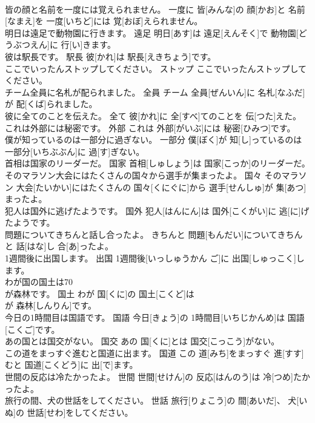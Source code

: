 \documentclass[8pt]{extreport}
\begin{document}
\begin{CJK}{UTF8}{min}
\\	皆の顔と名前を一度には覚えられません。	一度に	皆[みんな]の 顔[かお]と 名前[なまえ]を 一度[いちど]には 覚[おぼ]えられません。	
\\	明日は遠足で動物園に行きます。	遠足	明日[あす]は 遠足[えんそく]で 動物園[どうぶつえん]に 行[い]きます。	
\\	彼は駅長です。	駅長	彼[かれ]は 駅長[えきちょう]です。	
\\	ここでいったんストップしてください。	ストップ	ここでいったんストップしてください。	
\\	チーム全員に名札が配られました。	全員	チーム 全員[ぜんいん]に 名札[なふだ]が 配[くば]られました。	
\\	彼に全てのことを伝えた。	全て	彼[かれ]に 全[すべ]てのことを 伝[つた]えた。	
\\	これは外部には秘密です。	外部	これは 外部[がいぶ]には 秘密[ひみつ]です。	
\\	僕が知っているのは一部分に過ぎない。	一部分	僕[ぼく]が 知[し]っているのは 一部分[いちぶぶん]に 過[す]ぎない。	
\\	首相は国家のリーダーだ。	国家	首相[しゅしょう]は 国家[こっか]のリーダーだ。	
\\	そのマラソン大会にはたくさんの国々から選手が集まったよ。	国々	そのマラソン 大会[たいかい]にはたくさんの 国々[くにぐに]から 選手[せんしゅ]が 集[あつ]まったよ。	
\\	犯人は国外に逃げたようです。	国外	犯人[はんにん]は 国外[こくがい]に 逃[に]げたようです。	
\\	問題についてきちんと話し合ったよ。	きちんと	問題[もんだい]についてきちんと 話[はな]し 合[あ]ったよ。	
\\	1週間後に出国します。	出国	1週間後[いっしゅうかん ご]に 出国[しゅっこく]します。	
\\	わが国の国土は70
\\	が森林です。	国土	わが 国[くに]の 国土[こくど]は 
\\	[ななじゅっぱーせんと]が 森林[しんりん]です。	
\\	今日の1時間目は国語です。	国語	今日[きょう]の 1時間目[いちじかんめ]は 国語[こくご]です。	
\\	あの国とは国交がない。	国交	あの 国[くに]とは 国交[こっこう]がない。	
\\	この道をまっすぐ進むと国道に出ます。	国道	この 道[みち]をまっすぐ 進[すす]むと 国道[こくどう]に 出[で]ます。	
\\	世間の反応は冷たかったよ。	世間	世間[せけん]の 反応[はんのう]は 冷[つめ]たかったよ。	
\\	旅行の間、犬の世話をしてください。	世話	旅行[りょこう]の 間[あいだ]、 犬[いぬ]の 世話[せわ]をしてください。	

\end{CJK}
\end{document}
